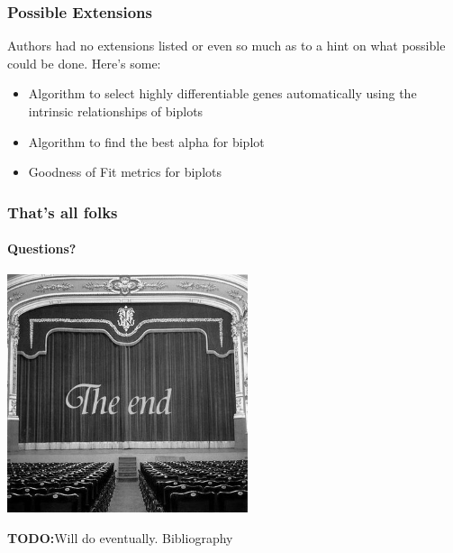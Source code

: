 \documentclass[serif]{beamer}
\begin{document}
	\begin{frame}[t]
		\frametitle{Possible Extensions}
		Authors had no extensions listed or even so much as to a hint on what possible could be done.
		\newline\newline
		Here's some:
		\begin{itemize}
			\item  Algorithm to select highly differentiable genes automatically
			using the intrinsic relationships of biplots
			\item  Algorithm to find the best alpha for biplot
			\item  Goodness of Fit metrics for biplots
		\end{itemize}
	\end{frame}
	
	\begin{frame}
		\frametitle{That's all folks}
		\framesubtitle{Questions?}
		
		\begin{center}
			\includegraphics[height=2.75in]{images/end}	
		\end{center}
		
	\end{frame}

	\begin{frame}
		\textbf{TODO:}Will do eventually. \newline
		Bibliography
	\end{frame}
	
\end{document}
